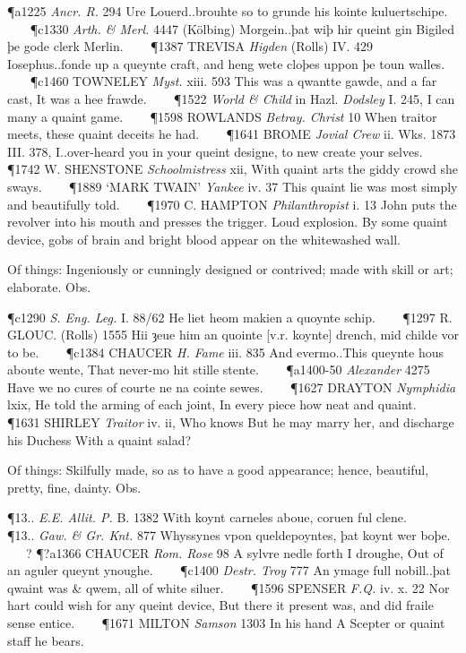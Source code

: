 \begin{description}[wide, labelwidth=!, labelindent=0pt]
\begin{myenumerate}
\P a1225  \textit{Ancr. R.} 294 Ure Louerd..brouhte so to grunde his kointe kuluertschipe.    
\P c1330 \textit{Arth. \& Merl.}  4447 (Kölbing) Morgein..þat wiþ hir queint gin Bigiled þe gode clerk Merlin.    
\P 1387 TREVISA  \textit{Higden} (Rolls) IV. 429 Iosephus..fonde up a queynte craft, and heng wete cloþes uppon þe toun walles.    
\P c1460 TOWNELEY  \textit{Myst.} xiii. 593 This was a qwantte gawde, and a far cast, It was a hee frawde.    
\P 1522  \textit{World \& Child} in Hazl. \textit{Dodsley} I. 245, I can many a quaint game.    
\P 1598 ROWLANDS  \textit{Betray. Christ} 10 When traitor meets, these quaint deceits he had.    
\P 1641  BROME \textit{Jovial Crew} ii. Wks. 1873 III.  378, I..over-heard you in your queint designe, to new create your selves.    
\P 1742 W. SHENSTONE  \textit{Schoolmistress} xii, With quaint arts the giddy crowd she sways.    
\P 1889 ‘MARK  TWAIN’ \textit{Yankee} iv. 37 This quaint lie was most simply and beautifully told.    
\P 1970 C. HAMPTON  \textit{Philanthropist} i. 13 John puts the revolver into his mouth and presses the trigger. Loud explosion. By some quaint device, gobs of brain and bright blood appear on the whitewashed wall.

 Of things: Ingeniously or cunningly designed or contrived; made with skill or art; elaborate. Obs.

\P c1290 \textit{S. Eng.  Leg.} I. 88/62 He liet heom makien a quoynte schip.    
\P 1297 R. GLOUC. (Rolls) 1555 Hii  ȝeue him an quointe [v.r. koynte] drench, mid childe vor to be.    
\P c1384 CHAUCER  \textit{H. Fame} iii. 835 And evermo..This queynte hous aboute wente, That never-mo hit stille stente.    
\P a1400-50  \textit{Alexander} 4275 Have we no cures of courte ne na cointe sewes.    
\P 1627 DRAYTON  \textit{Nymphidia} lxix, He told the arming of each joint, In every piece how neat and quaint.    
\P 1631 SHIRLEY  \textit{Traitor} iv. ii, Who knows But he may marry her, and discharge his Duchess With a quaint salad?

 Of things: Skilfully made, so as to have a good appearance; hence, beautiful, pretty, fine, dainty. Obs.

\P 13..  \textit{E.E. Allit. P.} B. 1382 With  koynt carneles aboue, coruen ful clene.    
\P 13..  \textit{Gaw. \& Gr. Knt.} 877 Whyssynes vpon queldepoyntes, þat koynt wer boþe.    ?
\P ?a1366 CHAUCER  \textit{Rom. Rose} 98 A sylvre nedle forth I droughe, Out of an aguler queynt ynoughe.    
\P c1400  \textit{Destr. Troy} 777 An ymage full nobill..þat qwaint was \& qwem, all of white siluer.    
\P 1596 SPENSER  \textit{F.Q.} iv. x. 22 Nor hart could wish for any queint device, But there it present was, and did fraile sense entice.    
\P 1671 MILTON  \textit{Samson} 1303 In his  hand A Scepter or quaint staff he bears.


\end{myenumerate}
\end{description}
